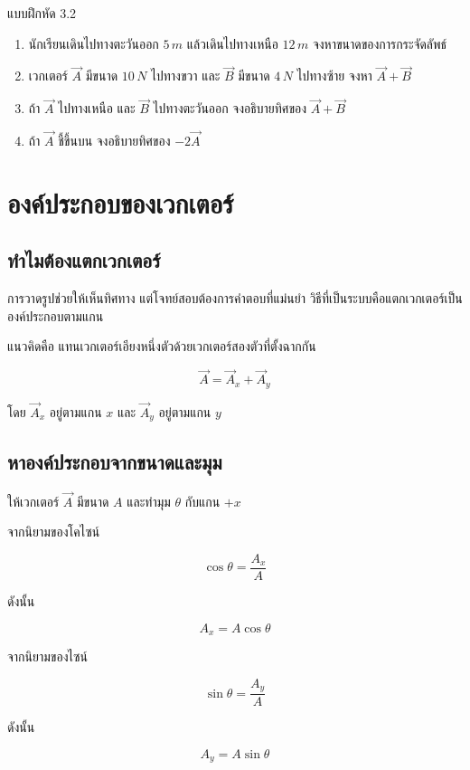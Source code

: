 \begin{exercisebox}{แบบฝึกหัด 3.2}
\begin{enumerate}
    \item นักเรียนเดินไปทางตะวันออก $5\,\si{m}$ แล้วเดินไปทางเหนือ $12\,\si{m}$ จงหาขนาดของการกระจัดลัพธ์
    \item เวกเตอร์ $\vec{A}$ มีขนาด $10\,\si{N}$ ไปทางขวา และ $\vec{B}$ มีขนาด $4\,\si{N}$ ไปทางซ้าย จงหา $\vec{A}+\vec{B}$
    \item ถ้า $\vec{A}$ ไปทางเหนือ และ $\vec{B}$ ไปทางตะวันออก จงอธิบายทิศของ $\vec{A}+\vec{B}$
    \item ถ้า $\vec{A}$ ชี้ขึ้นบน จงอธิบายทิศของ $-2\vec{A}$
\end{enumerate}
\end{exercisebox}

\section{องค์ประกอบของเวกเตอร์}

\subsection{ทำไมต้องแตกเวกเตอร์}

การวาดรูปช่วยให้เห็นทิศทาง แต่โจทย์สอบต้องการคำตอบที่แม่นยำ วิธีที่เป็นระบบคือแตกเวกเตอร์เป็นองค์ประกอบตามแกน

แนวคิดคือ แทนเวกเตอร์เอียงหนึ่งตัวด้วยเวกเตอร์สองตัวที่ตั้งฉากกัน

\[
\vec{A}=\vec{A}_x+\vec{A}_y
\]

โดย $\vec{A}_x$ อยู่ตามแกน $x$ และ $\vec{A}_y$ อยู่ตามแกน $y$

\subsection{หาองค์ประกอบจากขนาดและมุม}

ให้เวกเตอร์ $\vec{A}$ มีขนาด $A$ และทำมุม $\theta$ กับแกน $+x$

จากนิยามของโคไซน์

\[
\cos\theta=\frac{A_x}{A}
\]

ดังนั้น

\[
A_x=A\cos\theta
\]

จากนิยามของไซน์

\[
\sin\theta=\frac{A_y}{A}
\]

ดังนั้น

\[
A_y=A\sin\theta
\]

